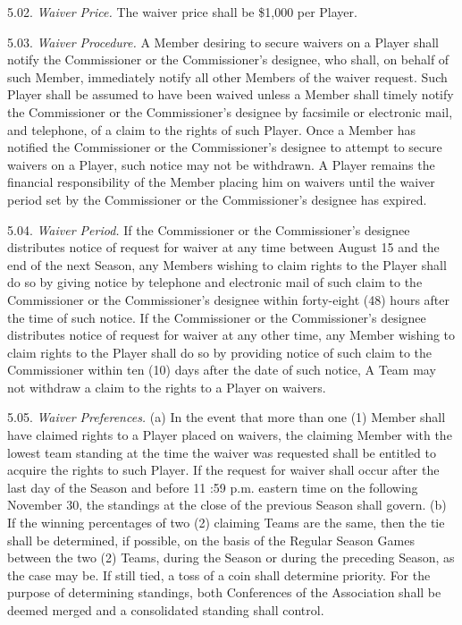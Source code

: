 \documentclass[
]{book}
\begin{document}
5.02. \emph{Waiver Price.} The waiver price shall be \$1,000 per Player.

5.03. \emph{Waiver Procedure.} A Member desiring to secure waivers on a Player shall notify the Commissioner or the Commissioner's designee, who shall, on behalf of such Member, immediately notify all other Members of the waiver request. Such Player shall be assumed to have been waived unless a Member shall timely notify the Commissioner or the Commissioner's designee by facsimile or electronic mail, and telephone, of a claim to the rights of such Player. Once a Member has notified the Commissioner or the Commissioner's designee to attempt to secure waivers on a Player, such notice may not be withdrawn. A Player remains the financial responsibility of the Member placing him on waivers until the waiver period set by the Commissioner or the Commissioner's designee has expired.

5.04. \emph{Waiver Period.} If the Commissioner or the Commissioner's designee distributes notice of request for waiver at any time between August 15 and the end of the next Season, any Members wishing to claim rights to the Player shall do so by giving notice by telephone and electronic mail of such claim to the Commissioner or the Commissioner's designee within forty-eight (48) hours after the time of such notice. If the Commissioner or the Commissioner's designee distributes notice of request for waiver at any other time, any Member wishing to claim rights to the Player shall do so by providing notice of such claim to the Commissioner within ten (10) days after the date of such notice, A Team may not withdraw a claim to the rights to a Player on waivers.

5.05. \emph{Waiver Preferences.}
(a) In the event that more than one (1) Member shall have claimed rights to a Player placed on waivers, the claiming Member with the lowest team standing at the time the waiver was requested shall be entitled to acquire the rights to such Player. If the request for waiver shall occur after the last day of the Season and before 11 :59 p.m. eastern time on the following November 30, the standings at the close of the previous Season shall govern.
(b) If the winning percentages of two (2) claiming Teams are the same, then the tie shall be determined, if possible, on the basis of the Regular Season Games between the two (2) Teams, during the Season or during the preceding Season, as the case may be. If still tied, a toss of a coin shall determine priority. For the purpose of determining standings, both Conferences of the Association shall be deemed merged and a consolidated standing shall control.
\end{document}
